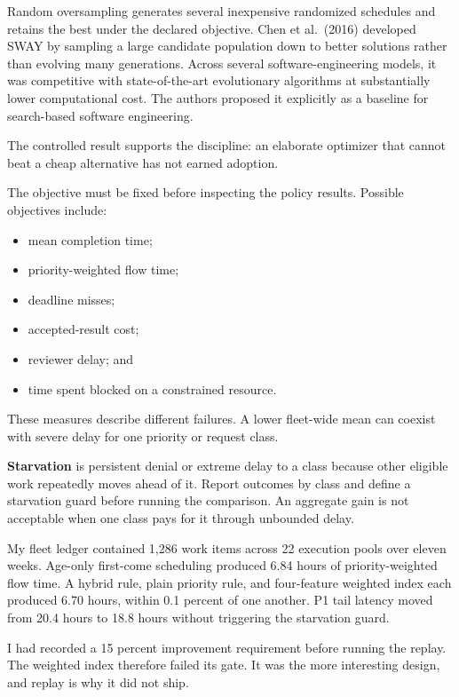 Random oversampling generates several inexpensive randomized schedules and retains the best under the declared objective. Chen et al.~(2016) developed SWAY by sampling a large candidate population down to better solutions rather than evolving many generations. Across several software-engineering models, it was competitive with state-of-the-art evolutionary algorithms at substantially lower computational cost. The authors proposed it explicitly as a baseline for search-based software engineering.

The controlled result supports the discipline: an elaborate optimizer that cannot beat a cheap alternative has not earned adoption.

The objective must be fixed before inspecting the policy results. Possible objectives include:

\begin{itemize}
\tightlist
\item
  mean completion time;
\item
  priority-weighted flow time;
\item
  deadline misses;
\item
  accepted-result cost;
\item
  reviewer delay; and
\item
  time spent blocked on a constrained resource.
\end{itemize}

These measures describe different failures. A lower fleet-wide mean can coexist with severe delay for one priority or request class.

\textbf{Starvation} is persistent denial or extreme delay to a class because other eligible work repeatedly moves ahead of it. Report outcomes by class and define a starvation guard before running the comparison. An aggregate gain is not acceptable when one class pays for it through unbounded delay.

My fleet ledger contained 1,286 work items across 22 execution pools over eleven weeks. Age-only first-come scheduling produced 6.84 hours of priority-weighted flow time. A hybrid rule, plain priority rule, and four-feature weighted index each produced 6.70 hours, within 0.1 percent of one another. P1 tail latency moved from 20.4 hours to 18.8 hours without triggering the starvation guard.

I had recorded a 15 percent improvement requirement before running the replay. The weighted index therefore failed its gate. It was the more interesting design, and replay is why it did not ship.

